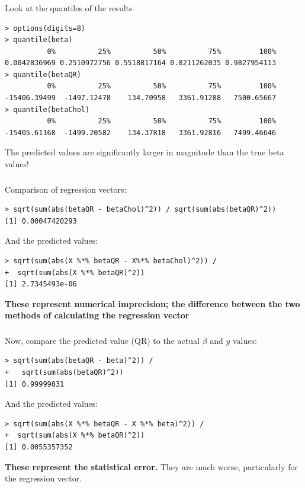 \begin{frame}[fragile] \frametitle{}

Look at the quantiles of the results
\begin{verbatim}
> options(digits=8)
> quantile(beta)
          0%          25%          50%          75%         100%
0.0042836969 0.2510972756 0.5518817164 0.8211262035 0.9827954113
> quantile(betaQR)
          0%          25%          50%          75%         100%
-15406.39499  -1497.12478    134.70958   3361.91288   7500.65667
> quantile(betaChol)
          0%          25%          50%          75%         100%
-15405.61168  -1499.20582    134.37818   3361.92816   7499.46646
\end{verbatim}
\pause The predicted values are significantly larger in magnitude
than the true beta values!

\end{frame}

\begin{frame}[fragile] \frametitle{}

Comparison of regression vectors:
\begin{verbatim}
> sqrt(sum(abs(betaQR - betaChol)^2)) / sqrt(sum(abs(betaQR)^2))
[1] 0.00047420293
\end{verbatim}
And the predicted values:
\begin{verbatim}
> sqrt(sum(abs(X %*% betaQR - X%*% betaChol)^2)) /
+  sqrt(sum(abs(X %*% betaQR)^2))
[1] 2.7345493e-06
\end{verbatim}

\pause
{\bf These represent numerical imprecision; the difference between
 the two methods of calculating the regression vector}

\end{frame}

\begin{frame}[fragile] \frametitle{}

Now, compare the predicted value (QR) to the actual $\beta$
and $y$ values:
\begin{verbatim}
> sqrt(sum(abs(betaQR - beta)^2)) /
+   sqrt(sum(abs(betaQR)^2))
[1] 0.99999031
\end{verbatim}
And the predicted values:
\begin{verbatim}
> sqrt(sum(abs(X %*% betaQR - X %*% beta)^2)) /
+  sqrt(sum(abs(X %*% betaQR)^2))
[1] 0.0055357352
\end{verbatim}

\pause
{\bf These represent the statistical error.} They are much worse,
particularly for the regression vector.

\end{frame}

